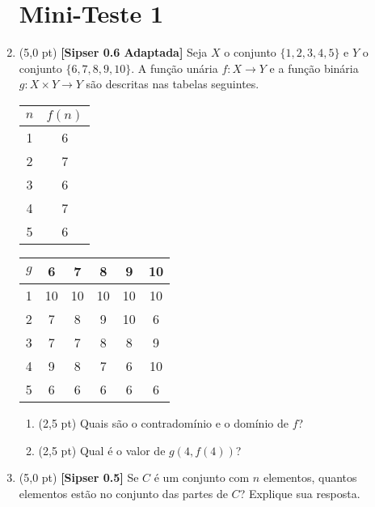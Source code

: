 \documentclass[12pt,a4paper,oneside]{article}
\begin{document}
\begin{enumerate}
	
	\section*{Mini-Teste 1}
	
	\item (5,0 pt) {\bf [Sipser 0.6 Adaptada] } Seja $X$ o conjunto $\{1,2,3,4,5\}$ e $Y$ o conjunto $\{6,7,8,9,10\}$. A função unária
	$f : X \rightarrow Y$ e a função binária $g: X \times Y \rightarrow Y$ são descritas nas tabelas seguintes.
	
	\begin{multicols}{2}
		
		\begin{tabular}{c|c}
			$n$	&	$f(n)$	\\
			\hline
			1 	&	6	\\			
			2 	&	7	\\
			3 	&	6	\\
			4 	&	7	\\
			5 	&	6	\\
			\hline
		\end{tabular}
		
		\columnbreak
		
		\begin{tabular}{c|ccccc}
			$g$	& 	6	& 	7	& 	8	& 	9	&	10 \\
			\hline
			1	&	10	&	10	&	10	&	10	&	10 \\
			2	& 	7	& 	8	& 	9	& 	10	& 	6 \\	
			3	& 	7	& 	7	& 	8	& 	8	& 	9 \\
			4	& 	9	& 	8	& 	7	& 	6	& 	10 \\
			5	& 	6	& 	6	& 	6	& 	6	& 	6 \\
			\hline
		\end{tabular}
		
	\end{multicols}
	
	\begin{enumerate}
		\item (2,5 pt) Quais são o contradomínio e o domínio de $f$?
		\item (2,5 pt) Qual é o valor de $g(4,f(4))$?
	\end{enumerate}

	\item (5,0 pt) {\bf [Sipser 0.5]} Se $C$ é um conjunto com $n$ elementos, quantos elementos estão no conjunto das partes de $C$? Explique sua resposta.


\end{enumerate}
\end{document}
